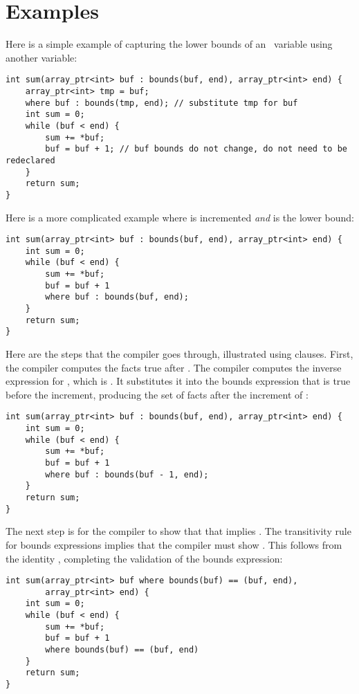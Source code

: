 \section{Examples}

Here is a simple example of capturing the lower bounds of an
\arrayptr\ variable using another variable:

\begin{lstlisting}
int sum(array_ptr<int> buf : bounds(buf, end), array_ptr<int> end) {
    array_ptr<int> tmp = buf;
    where buf : bounds(tmp, end); // substitute tmp for buf
    int sum = 0;
    while (buf < end) {
        sum += *buf;   
        buf = buf + 1; // buf bounds do not change, do not need to be redeclared
    }
    return sum;
}
\end{lstlisting}

Here is a more complicated example where  is incremented
\emph{and}  is the lower bound:

\begin{lstlisting}
int sum(array_ptr<int> buf : bounds(buf, end), array_ptr<int> end) {
    int sum = 0;
    while (buf < end) {
        sum += *buf;   
        buf = buf + 1
        where buf : bounds(buf, end);
    }
    return sum;
}
\end{lstlisting}

Here are the steps that the compiler goes through, illustrated using 
 clauses. First, the compiler computes the facts true after
. The compiler computes the inverse expression for
, which is . It substitutes it into the
bounds expression that is true before the increment, producing the set
of facts after the increment of 
:

\begin{lstlisting}
int sum(array_ptr<int> buf : bounds(buf, end), array_ptr<int> end) {
    int sum = 0;
    while (buf < end) {
        sum += *buf;   
        buf = buf + 1
        where buf : bounds(buf - 1, end); 
    }
    return sum;
}
\end{lstlisting}

The next step is for the compiler to show that that  implies . The
transitivity rule for bounds expressions implies that the compiler must
show . This follows from the
identity  \code{-}  \code{<} ,
completing the validation of the bounds expression:

\begin{lstlisting}
int sum(array_ptr<int> buf where bounds(buf) == (buf, end), 
        array_ptr<int> end) {
    int sum = 0;
    while (buf < end) {
        sum += *buf;   
        buf = buf + 1
        where bounds(buf) == (buf, end) 
    }
    return sum;
}
\end{lstlisting}
